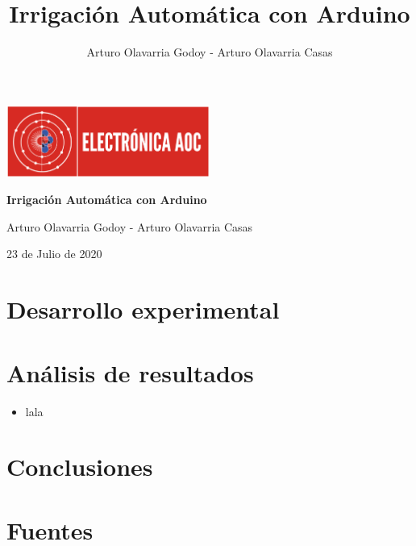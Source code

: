 \documentclass[a4paper]{article}
\title{Irrigaci\'on Autom\'atica con Arduino}
\author{Arturo Olavarria Godoy - Arturo Olavarria Casas}
\begin{document}
    \begin{titlepage}
        \centering
        {\includegraphics[width=0.5\textwidth]{./001_Recursos/000_Logo.png}\par}
        \vspace{1cm}
        {\bfseries\LARGE Irrigaci\'on Autom\'atica con Arduino \par}
        \vspace{1cm}
        {\large Arturo Olavarria Godoy - Arturo Olavarria Casas \par}
        \vfill
        {\Large 23 de Julio de 2020 \par} 
    \end{titlepage}
    
    \tableofcontents
    
    

    \section{Desarrollo experimental}
    \section{Análisis de resultados}
    \begin{itemize}
        \item lala
    \end{itemize}
    \section{Conclusiones}
    \section{Fuentes}
\end{document}
